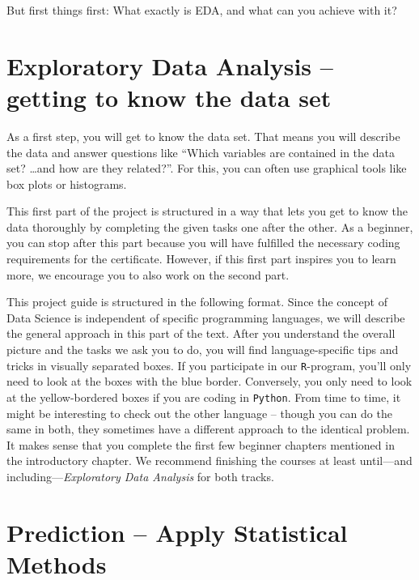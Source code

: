 \documentclass[
  11pt,
]{book}
\begin{document}
But first things first: What exactly is EDA, and what can you achieve with it?

\hypertarget{exploratory-data-analysis-getting-to-know-the-data-set}{%
\section{Exploratory Data Analysis -- getting to know the data set}\label{exploratory-data-analysis-getting-to-know-the-data-set}}

As a first step, you will get to know the data set. That means you will describe the data and answer questions like ``Which variables are contained in the data set? \ldots and how are they related?''. For this, you can often use graphical tools like box plots or histograms.

This first part of the project is structured in a way that lets you get to know the data thoroughly by completing the given tasks one after the other. As a beginner, you can stop after this part because you will have fulfilled the necessary coding requirements for the certificate. However, if this first part inspires you to learn more, we encourage you to also work on the second part.

This project guide is structured in the following format. Since the concept of Data Science is independent of specific programming languages, we will describe the general approach in this part of the text. After you understand the overall picture and the tasks we ask you to do, you will find language-specific tips and tricks in visually separated boxes. If you participate in our \texttt{R}-program, you'll only need to look at the boxes with the blue border. Conversely, you only need to look at the yellow-bordered boxes if you are coding in \texttt{Python}. From time to time, it might be interesting to check out the other language -- though you can do the same in both, they sometimes have a different approach to the identical problem. It makes sense that you complete the first few beginner chapters mentioned in the introductory chapter. We recommend finishing the courses at least until---and including---\emph{Exploratory Data Analysis} for both tracks.

\hypertarget{prediction-apply-statistical-methods}{%
\section{Prediction -- Apply Statistical Methods}\label{prediction-apply-statistical-methods}}
\end{document}
